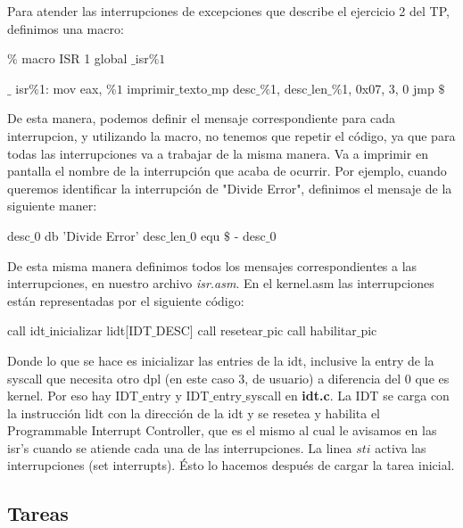 Para atender las interrupciones de excepciones que describe el ejercicio 2 del TP, definimos una macro:
\begin{algorithmic}
\State \tab $\%$ macro ISR 1
\State \tab global $\_$isr$\%1$

\State \tab $\_$ isr$\%$1:
    \State \tab \tab mov eax, $\%1$
    \State \tab \tab imprimir$\_$texto$\_$mp desc$\_\%$1, desc$\_$len$\_\%$1, 0x07, 3, 0
    \State \tab \tab jmp $\$$

\State \tab %
\end{algorithmic}

De esta manera, podemos definir el mensaje correspondiente para cada interrupcion, y utilizando la macro, no tenemos que repetir el c\'odigo, ya que para todas las interrupciones va a trabajar de la misma manera. Va a imprimir en pantalla el nombre de la interrupci\'on que acaba de ocurrir.
Por ejemplo, cuando queremos identificar la interrupci\'on de "Divide Error", definimos el mensaje de la siguiente maner:

\begin{algorithmic}
\State \tab desc$\_$0 db   'Divide Error'
\State \tab desc$\_$len$\_$0 equ     $\$$ - desc$\_$0
\end{algorithmic}

De esta misma manera definimos todos los mensajes correspondientes a las interrupciones, en nuestro archivo \textit{isr.asm}.
\newline
En el kernel.asm las interrupciones están representadas por el siguiente código:
\begin{algorithmic}
\State call idt$\_$inicializar
\State lidt[IDT$\_$DESC]
\State call resetear$\_$pic
\State call habilitar$\_$pic
\end{algorithmic}

Donde lo que se hace es inicializar las entries de la idt, inclusive la entry de la syscall que necesita otro dpl (en este caso 3, de usuario) a diferencia del 0 que es kernel. Por eso hay IDT$\_$entry y IDT$\_$entry$\_$syscall en \textbf{idt.c}. La IDT se carga con la instrucción lidt con la dirección de la idt y se resetea y habilita el Programmable Interrupt Controller, que es el mismo al cual le avisamos en las isr's cuando se atiende cada una de las interrupciones. La linea $sti$ activa las interrupciones (set interrupts). Ésto lo hacemos después de cargar la tarea inicial.
\subsection{Tareas}

